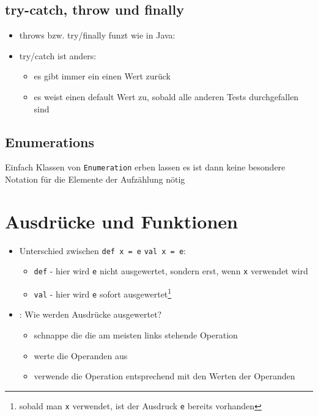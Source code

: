 \subsection{try-catch, throw und finally}
\begin{itemize}
  \item throws bzw. try/finally funzt wie in Java:
  
  
  
  \item try/catch ist anders:
  \begin{itemize}
    \item es gibt immer ein einen Wert zurück
    \item es weist einen default Wert zu, sobald alle anderen Tests
    durchgefallen sind
    
        
  \end{itemize}
\end{itemize}


\subsection{Enumerations}
Einfach Klassen von \texttt{Enumeration} erben lassen \und es ist dann
keine besondere Notation für die Elemente der Aufzählung nötig


\pagebreak


\section{Ausdrücke und Funktionen}
\begin{itemize}
  \item Unterschied zwischen \texttt{def x = e} \und \texttt{val x = e}:
  \begin{itemize}
    \item \texttt{def} - hier wird \texttt{e} nicht ausgewertet, sondern erst,
    wenn \texttt{x} verwendet wird
    \item \texttt{val} - hier wird \texttt{e} sofort 
    ausgewertet\footnote{sobald man \texttt{x} verwendet, ist der Ausdruck 
    \texttt{e} bereits vorhanden}
  \end{itemize}
  \item {}: Wie werden Ausdrücke ausgewertet? \begin{itemize}
    \item schnappe die die am meisten links stehende Operation
    \item werte die Operanden aus
    \item verwende die Operation entsprechend mit den Werten der Operanden
  \end{itemize}
\end{itemize}


